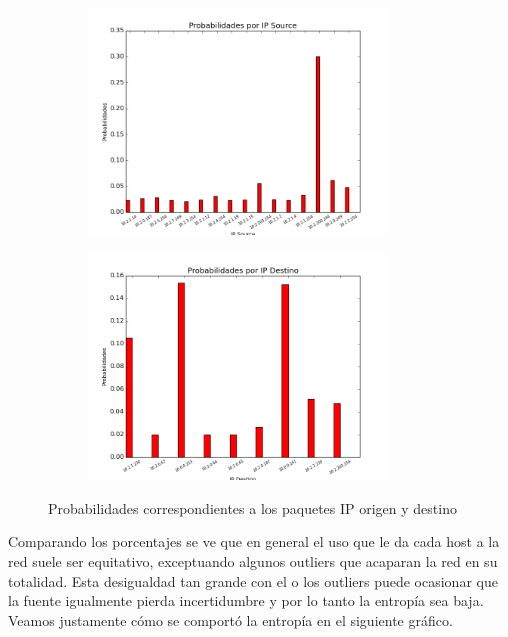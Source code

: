 \begin{figure}[H]

\begin{subfigure}{0.6\textwidth}
\includegraphics[width=0.9\linewidth, height=6cm]{imagenes/exp2/6v2ProbabilidadesIPSource} 
\caption{}
\end{subfigure}
\begin{subfigure}{0.6\textwidth}
\includegraphics[width=0.9\linewidth, height=6cm]{imagenes/exp2/7v2ProbabilidadesIPDestino}
\caption{}
\end{subfigure}

\caption{Probabilidades correspondientes a los paquetes IP origen y destino}
\label{fig:1}
\end{figure}

Comparando los porcentajes se ve que en general el uso que le da cada host a la red suele ser equitativo, exceptuando algunos outliers que acaparan la red en su totalidad. Esta desigualdad tan grande con el o los outliers puede ocasionar que la fuente igualmente pierda incertidumbre y por lo tanto la entrop\'ia sea baja. Veamos justamente c\'omo se comport\'o la entrop\'ia en el siguiente gr\'afico.

